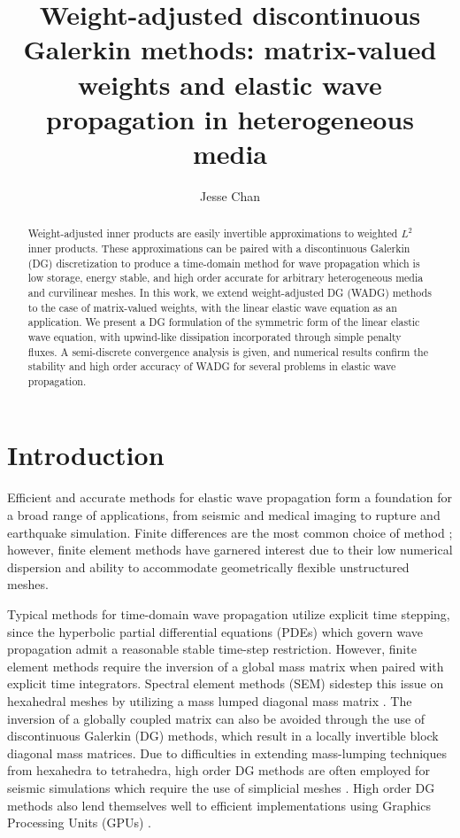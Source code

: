 \documentclass{siamart0216}
\date{}
\author{Jesse Chan}
\title{Weight-adjusted discontinuous Galerkin methods: matrix-valued weights and elastic wave propagation in heterogeneous media}
\begin{document}
\maketitle

\begin{abstract}
Weight-adjusted inner products \cite{chan2016weight1,chan2016weight2} are easily invertible approximations to weighted $L^2$ inner products.  These approximations can be paired with a discontinuous Galerkin (DG) discretization to produce a time-domain method for wave propagation which is low storage, energy stable, and high order accurate for arbitrary heterogeneous media and curvilinear meshes.  In this work, we extend weight-adjusted DG (WADG) methods to the case of matrix-valued weights, with the linear elastic wave equation as an application.  We present a DG formulation of the symmetric form of the linear elastic wave equation, with upwind-like dissipation incorporated through simple penalty fluxes.  A semi-discrete convergence analysis is given, and numerical results confirm the stability and high order accuracy of WADG for several problems in elastic wave propagation.  
\end{abstract}



\section{Introduction}

Efficient and accurate methods for elastic wave propagation form a foundation for a broad range of applications, from seismic and medical imaging to rupture and earthquake simulation.  Finite differences are the most common choice of method \cite{virieux1986p}; however, finite element methods have garnered interest due to their low numerical dispersion and ability to accommodate geometrically flexible unstructured meshes.  

Typical methods for time-domain wave propagation utilize explicit time stepping, since the hyperbolic partial differential equations (PDEs) which govern wave propagation admit a reasonable stable time-step restriction.  However, finite element methods require the inversion of a global mass matrix when paired with explicit time integrators.  Spectral element methods (SEM) sidestep this issue on hexahedral meshes by utilizing a mass lumped diagonal mass matrix \cite{komatitsch1998spectral}.  The inversion of a globally coupled matrix can also be avoided through the use of discontinuous Galerkin (DG) methods, which result in a locally invertible block diagonal mass matrices.  Due to difficulties in extending mass-lumping techniques from hexahedra to tetrahedra, high order DG methods are often employed for seismic simulations which require the use of simplicial meshes \cite{kaser2006arbitrary, dumbser2006arbitrary, de2007arbitrary,delcourte2009high,delcourte2015analysis,ye2016discontinuous}.  High order DG methods also lend themselves well to efficient implementations using Graphics Processing Units (GPUs) \cite{klockner2009nodal, modave2015nodal, modave2016gpu, chan2015gpu}.  
\end{document}
